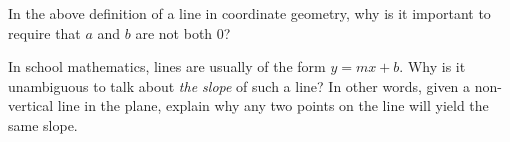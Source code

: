 \begin{prob}
In the above definition of a line in coordinate geometry, why is it important to require that $a$ and $b$ are not both 0?  
\end{prob}

\begin{prob}
In school mathematics, lines are usually of the form $y = mx + b$.  Why is it unambiguous to talk about \emph{the slope} of such a line?  In other words, given a non-vertical line in the plane, explain why any two points on the line will yield the same slope.  
\end{prob}

